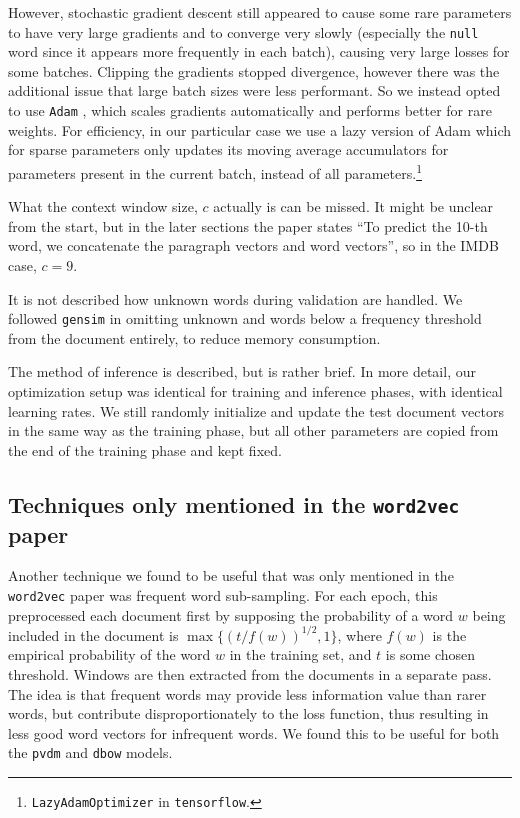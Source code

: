 \documentclass{article}
\begin{document}
However, stochastic gradient descent still appeared to cause some rare parameters to have very large gradients and to converge very slowly (especially the \texttt{null} word since it appears more frequently in each batch), causing very large losses for some batches. Clipping the gradients stopped divergence, however there was the additional issue that large batch sizes were less performant. So we instead opted to use \texttt{Adam} \citep{kingma_adam:_2014}, which scales gradients automatically and performs better for rare weights. For efficiency, in our particular case we use a lazy version of Adam which for sparse parameters only updates its moving average accumulators for parameters present in the current batch, instead of all parameters.\footnote{\texttt{LazyAdamOptimizer} in \texttt{tensorflow}.}

What the context window size, $c$ actually is can be missed. It might be unclear from the start, but in the later sections the paper states ``To predict the 10-th word, we concatenate the paragraph vectors and word vectors'', so in the IMDB case, $c=9$.

It is not described how unknown words during validation are handled. We followed \texttt{gensim} in omitting unknown and words below a frequency threshold from the document entirely, to reduce memory consumption.

The method of inference is described, but is rather brief. In more detail, our optimization setup was identical for training and inference phases, with identical learning rates. We still randomly initialize and update the test document vectors in the same way as the training phase, but all other parameters are copied from the end of the training phase and kept fixed.

\subsection{Techniques only mentioned in the \texttt{word2vec} paper}
Another technique we found to be useful that was only mentioned in the \texttt{word2vec} paper was frequent word sub-sampling. For each epoch, this preprocessed each document first by supposing the probability of a word $w$ being included in the document is $\max\{(t/f(w))^{1/2}, 1\}$, where $f(w)$ is the empirical probability of the word ${w}$ in the training set, and $t$ is some chosen threshold. Windows are then extracted from the documents in a separate pass. The idea is that frequent words may provide less information value than rarer words, but contribute disproportionately to the loss function, thus resulting in less good word vectors for infrequent words. We found this to be useful for both the \texttt{pvdm} and \texttt{dbow} models.
\end{document}
